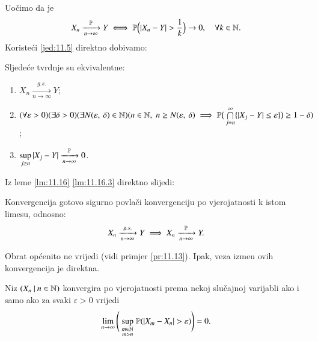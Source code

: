 Uo\v cimo da je
\begin{equation}    \label{jed:11.15}
    X_n \xrightarrow[n \to \infty]{\mathbb{P}} Y \iff \mathbb{P} \Big( |X_n - Y| > \frac{1}{k} \Big) \to 0, \quad \forall k \in \mathbb{N}.
\end{equation}
Koriste\' ci \eqref{jed:11.5} direktno dobivamo:

\begin{lm}  \label{lm:11.16}
    Sljede\' ce tvrdnje su ekvivalentne:
    \begin{enumerate}[label=(\roman*)]
        \item $X_n \xrightarrow[n \to \infty]{g.s.} Y$;
        \item $(\forall \varepsilon > 0)(\exists \delta > 0) (\exists N ({\varepsilon}, \: {\delta}) \in \mathbb{N})\\
        (n \in \mathbb{N}, \; n \geq N ({\varepsilon}, \: {\delta}) \implies \mathbb{P} \big( \bigcap\limits_{j = n}^{\infty} \{ |X_j - Y| \leq \varepsilon \} \big) \geq 1 - \delta)$;
        \item   \label{lm:11.16.3}
        $\sup\limits_{j \geq n} |X_j - Y| \xrightarrow[n  \to \infty]{\mathbb{P}} 0$.
    \end{enumerate}
\end{lm}
 Iz leme \ref{lm:11.16} \ref{lm:11.16.3} direktno slijedi:

\begin{kor}    \label{kor:11.17}
    Konvergencija gotovo sigurno povla\v ci konvergenciju po vjerojatnosti k istom limesu, odnosno:
    \begin{equation*}
        X_n \xrightarrow[n \to \infty]{g.s.} Y \implies X_n \xrightarrow[n \to \infty]{\mathbb{P}} Y.
    \end{equation*}
\end{kor}

Obrat op\' cenito ne vrijedi (vidi primjer \ref{pr:11.13}).
Ipak, veza izme\dj u ovih konvergencija je direktna.
 
\begin{lm} \label{lm:11.18}
    Niz $({X_n} \: | \: {n \in \mathbb{N}})$ konvergira po vjerojatnosti prema nekoj slu\v cajnoj varijabli ako i samo ako za svaki $\varepsilon > 0$ vrijedi
    \begin{equation*}
        \lim\limits_{n \to \infty} \Bigg( \sup\limits_{
            \begin{smallmatrix}
               m \in \mathbb{N}\\
               m > n
            \end{smallmatrix}
        }  \mathbb{P}({ |X_m - X_n| > \varepsilon })\Bigg) = 0.
    \end{equation*}
\end{lm}

